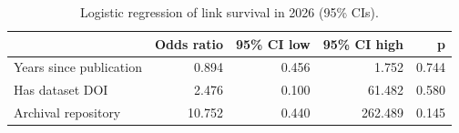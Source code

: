 \begin{table}
\caption{Logistic regression of link survival in 2026 (95\% CIs).}
\label{tab:link_survival}
\begin{tabular}{lrrrr}
\toprule
 & Odds ratio & 95\% CI low & 95\% CI high & p \\
\midrule
Years since publication & 0.894 & 0.456 & 1.752 & 0.744 \\
Has dataset DOI & 2.476 & 0.100 & 61.482 & 0.580 \\
Archival repository & 10.752 & 0.440 & 262.489 & 0.145 \\
\bottomrule
\end{tabular}
\end{table}
